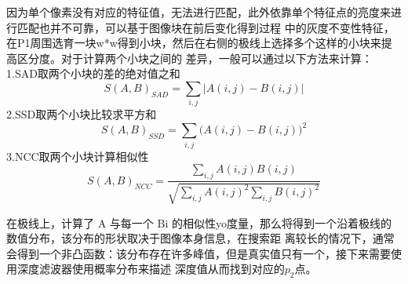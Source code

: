 因为单个像素没有对应的特征值，无法进行匹配，此外依靠单个特征点的亮度来进行匹配也并不可靠，可以基于图像块在前后变化得到过程
中的灰度不变性特征，在P1周围选育一块w*w得到小块，然后在右侧的极线上选择多个这样的小块来提高区分度。对于计算两个小块之间的
差异，一般可以通过以下方法来计算：\\
1.SAD取两个小块的差的绝对值之和
\begin{equation}
  S{(A,B)}_{SAD}=\sum_{i,j}\left|A(i,j)-B(i,j)\right|
\end{equation}
2.SSD取两个小块比较求平方和
\begin{equation}
S{(A,B)}_{SSD}=\sum_{i,j}(A(i,j)-B{(i,j))}^2
\end{equation}
3.NCC取两个小块计算相似性
\begin{equation}
  S{(A,B)}_{NCC}=\frac{{\displaystyle\sum_{i,j}}A(i,j)B(i,j)}{\sqrt{{\displaystyle\sum_{i,j}}A{(i,j)}^2\underset{i,j}\sum B{(i,j)}^2}}
\end{equation}

在极线上，计算了 A 与每一个 Bi 的相似性yo度量，那么将得到一个沿着极线的数值分布，该分布的形状取决于图像本身信息，在搜索距
离较长的情况下，通常会得到一个非凸函数：该分布存在许多峰值，但是真实值只有一个，接下来需要使用深度滤波器使用概率分布来描述
深度值从而找到对应的$p_2$点。
